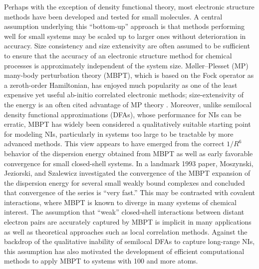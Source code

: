 \documentclass[journal=jctcce,manuscript=article]{achemso}
\begin{document}
Perhaps with the exception of density functional theory, most electronic
structure methods have been developed and tested for small molecules. A
central assumption underlying this ``bottom-up'' approach is that methods performing well for small
systems may be scaled up to larger ones without deterioration in accuracy.
Size consistency and size extensivity\cite{doi:10.1002/qua.560100802,
  doi:10.1146/annurev.pc.32.100181.002043,hirata2011} 
are often assumed to be sufficient to ensure that the accuracy of an
electronic structure method for chemical processes is approximately
independent of the system size. M{\o}ller--Plesset (MP) many-body
perturbation theory (MBPT),\cite{PhysRev.46.618} 
which is based on the Fock operator as a zeroth-order Hamiltonian, has enjoyed
much popularity as one of the least expensive yet useful ab-initio
correlated electronic methods; size-extensivity of the energy is an
often cited advantage of MP theory \cite{doi:10.1002/qua.560100802}.
Moreover, unlike semilocal density functional approximations (DFAs), whose
performance for NIs can be erratic,\cite{Kristyan94ChemPhysLett229p175,perezJorda1995134,
  doi:10.1002/jcc.540161102} MBPT has widely been considered a
qualitatively suitable starting point for modeling NIs, particularly in
systems too large to be tractable by more advanced
methods.\cite{doi:10.1021/jp070589p,doi:10.1002/cphc.200800718,Riley12JPhysChemA116p4159}
This view appears to have emerged from the correct $1/R^6$ behavior of the
dispersion energy obtained from MBPT as well as early favorable convergence for
small closed-shell systems.\cite{doi:10.1002/qua.560450502,doi:10.1063/1.465554}
In a landmark 1993 paper\cite{doi:10.1002/qua.560450502}, Moszynski,
Jeziorski, and Szalewicz investigated the convergence of the MBPT
expansion of the dispersion energy for several small weakly bound
complexes and concluded that convergence of the series is ``very fast.''
This may be contrasted with covalent interactions, where MBPT is known
to diverge in many systems of chemical interest.\cite{doi:10.1063/1.472352,
  doi:10.1021/jp952815d,doi:10.1063/1.481764}
The assumption that ``weak'' closed-shell interactions between distant electron
pairs are accurately captured by MBPT is implicit in many applications
as well as 
theoretical approaches such as local correlation
methods.\cite{doi:10.1063/1.2982419} Against the backdrop of the
qualitative inability of semilocal DFAs to capture 
long-range NIs, this assumption has also motivated the development of
efficient computational 
methods to apply MBPT to systems with 100 and more atoms.\cite{pulay1983151,doi:10.1063/1.479957,
  doi:10.1063/1.4923369,doi:10.1063/1.1578621,doi:10.1021/acs.jctc.7b00176}
\end{document}
